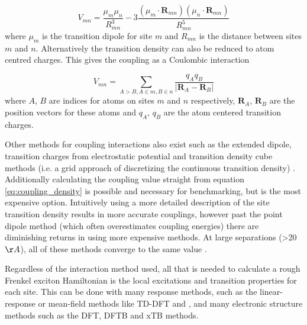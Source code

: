 \begin{equation}
    V_{mn} = \frac{\mu_m \mu_n}{R_{mn}^3} - 3 \frac{\left(\mu_m \cdot \mathbf{R}_{mn}\right) \left( \mu_n \cdot \mathbf{R}_{mn} \right)}{R_{mn}^5}
\end{equation}
%
where $\mu_m$ is the transition dipole for site $m$ and $R_{mn}$ is the distance
between sites $m$ and $n$. Alternatively the transition density can also be reduced 
to atom centred charges. This gives the coupling as a Coulombic interaction

\begin{equation}
    V_{mn} = \sum_{A>B,A \in m, B \in n}\frac{q_A q_B}{\left\lvert \mathbf{R}_A - \mathbf{R}_B \right\rvert}
\end{equation}
%
where $A$, $B$ are indices for atoms on sites $m$ and $n$ respectively, $\mathbf{R}_A$, $\mathbf{R}_B$
are the position vectors for these atoms and $q_A$, $q_B$ are the atom centered 
transition charges.

Other methods for coupling interactions also exist such as the extended dipole,
transition charges from electrostatic potential and transition density cube methods
(i.e. a grid approach of discretizing the continuous transition density) \cite{Kenny2016}. 
Additionally calculating the coupling value straight from equation \ref{eq:coupling_density} 
is possible and necessary for benchmarking, but is the most expensive option. Intuitively
using a more detailed description of the site transition density results in more 
accurate couplings, however past the point dipole method (which often overestimates
coupling energies) there are diminishing returns in using more expensive methods.
At large separations (>20 $\AA{}$), all of these methods converge to the same value \cite{Kenny2016}.

Regardless of the interaction method used, all that is needed to calculate a rough
Frenkel exciton Hamiltonian is the local excitations and transition properties for 
each site. This can be done with many response methods, such as the linear-response 
or mean-field methods like TD-DFT and \dscf, and many electronic structure methods 
such as the DFT, DFTB and xTB methods.
 
